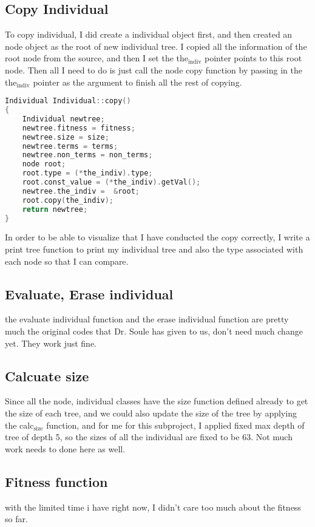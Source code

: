 \documentclass[10pt,b5paper]{article}
\begin{document}
\subsection{Copy Individual}
\label{sec-2-4}
To copy individual, I did create a individual object first, and then created an node object as the root of new individual tree. I copied all the information of the root node from the source, and then I set the the$_{\text{indiv}}$ pointer points to this root node. Then all I need to do is just call the node copy function by passing in the the$_{\text{indiv}}$ pointer as the argument to finish all the rest of copying. 
\begin{lstlisting}[language=c++]
Individual Individual::copy() 
{
    Individual newtree;
    newtree.fitness = fitness;
    newtree.size = size;
    newtree.terms = terms;
    newtree.non_terms = non_terms;
    node root;
    root.type = (*the_indiv).type;
    root.const_value = (*the_indiv).getVal();
    newtree.the_indiv =  &root;
    root.copy(the_indiv);
    return newtree;
}
\end{lstlisting}
In order to be able to visualize that I have conducted the copy correctly, I write a print tree function to print my individual tree and also the type associated with each node so that I can compare. 
\subsection{Evaluate, Erase individual}
\label{sec-2-5}
the evaluate individual function and the erase individual function are pretty much the original codes that Dr. Soule has given to us, don't need much change yet. They work just fine. 
\subsection{Calcuate size}
\label{sec-2-6}
Since all the node, individual classes have the size function defined already to get the size of each tree, and we could also update the size of the tree by applying the calc$_{\text{size}}$ function, and for me for this subproject, I applied fixed max depth of tree of depth 5, so the sizes of all the individual are fixed to be 63. Not much work needs to done here as well. 

\subsection{Fitness function}
\label{sec-2-7}
with the limited time i have right now, I didn't care too much about the fitness so far. 
\end{document}
